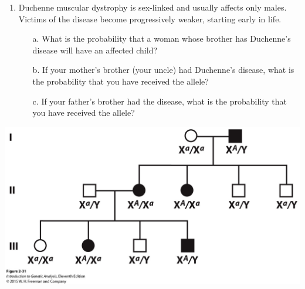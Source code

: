 \documentclass[11pt,]{article}
\providecommand{\tightlist}{%
  \setlength{\itemsep}{0pt}\setlength{\parskip}{0pt}}
\begin{document}
\begin{blackbox}

\begin{enumerate}
\def\labelenumi{\arabic{enumi}.}
\setcounter{enumi}{60}
\tightlist
\item
  Duchenne muscular dystrophy is sex-linked and usually affects only
  males. Victims of the disease become progressively weaker, starting
  early in life.

  \begin{enumerate} 
   \item[a.]{ What is the probability that a woman whose brother has Duchenne’s disease will have an affected child? } 
   \item[b.]{ If your mother’s brother (your uncle) had Duchenne’s disease, what is the probability that you have received the allele? } 
   \item[c.]{ If your father’s brother had the disease, what is the probability that you have received the allele? } 
   \end{enumerate}
\end{enumerate}

\hfill\break

\begin{center}\includegraphics[width=0.55\linewidth,]{input/figure_02_31} \end{center}

\vspace{12cm}

\end{blackbox}
\end{document}
